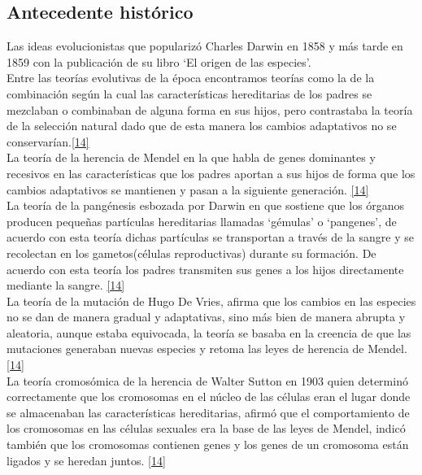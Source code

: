 		\subsection{Antecedente histórico}

		Las ideas evolucionistas que popularizó Charles Darwin en 1858 y más tarde en 1859 con la publicación de su libro ‘El origen de las especies’.\\

		Entre las teorías evolutivas de la época encontramos teorías como la de la combinación según la cual las características hereditarias de los padres se mezclaban o combinaban de alguna forma en sus hijos, pero contrastaba la teoría de la selección natural dado que de esta manera los cambios adaptativos no se conservarían.\ref{14} \\ 

		La teoría de la herencia de Mendel en la que habla de genes dominantes y recesivos en las características que los padres aportan a sus hijos de forma que los cambios adaptativos se mantienen y pasan a la siguiente generación. \ref{14}\\

		La teoría de la pangénesis esbozada por Darwin en que sostiene que los órganos producen pequeñas partículas hereditarias llamadas ‘gémulas’ o ‘pangenes’, de acuerdo con esta teoría dichas partículas se transportan a través de la sangre y se recolectan en los gametos(células reproductivas) durante su formación. De acuerdo con esta teoría los padres transmiten sus genes a los hijos directamente mediante la sangre. \ref{14}\\

		La teoría de la mutación de Hugo De Vries, afirma que los cambios en las especies no se dan de manera gradual y adaptativas, sino más bien de manera abrupta y aleatoria, aunque estaba equivocada, la teoría se basaba en la creencia de que las mutaciones generaban nuevas especies y retoma las leyes de herencia de Mendel. \ref{14}\\

		La teoría cromosómica de la herencia de Walter Sutton en 1903 quien determinó correctamente que los cromosomas en el núcleo de las células eran el lugar donde se almacenaban las características hereditarias, afirmó que el comportamiento de los cromosomas en las células sexuales era la base de las leyes de Mendel, indicó también que los cromosomas contienen genes y los genes de un cromosoma están ligados y se heredan juntos. \ref{14}\\

